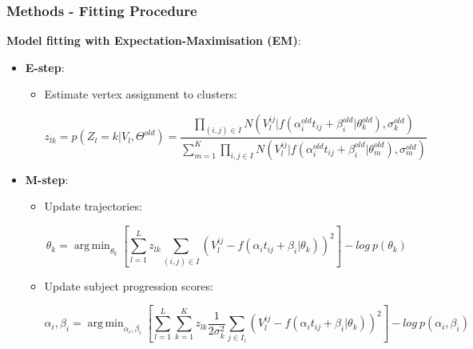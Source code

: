 \documentclass[8pt,xcolor=table]{beamer}
\DeclareMathOperator*{\argmin}{arg\,min}
\begin{document}
\begin{frame}
\frametitle{Methods - Fitting Procedure}


     
    \vspace{1em} 
    \textbf{Model fitting with Expectation-Maximisation (EM)}:
    \vspace{1em}
    \begin{itemize}
    \item \textbf{E-step}:
    \begin{itemize}
     \item Estimate vertex assignment to clusters:
     
     \begin{equation}
 z_{lk} =  p(Z_l = k|V_l,\Theta^{old}) =  \frac{\prod_{(i,j) \in I} N(V_l^{ij} | f(\alpha_i^{old} t_{ij} + \beta_i^{old} | \theta_k^{old}), \sigma_k^{old})}{\sum_{m=1}^K \prod_{i,j \in I} N(V_l^{ij} | f(\alpha_i^{old} t_{ij} + \beta_i^{old} | \theta_m^{old}), \sigma_m^{old})}
\end{equation}

    \end{itemize}
    \item \textbf{M-step}:
    \begin{itemize}
     \item Update trajectories:
     
     \begin{equation}
 \label{eq:theta}
 \theta_k = \argmin_{\theta_k} \left[\sum_{l=1}^L z_{lk} \sum_{(i,j) \in I} (V_l^{ij} - f(\alpha_i t_{ij} + \beta_i | \theta_k))^2 \right] - log\ p(\theta_k) 
\end{equation}
     
     \item Update subject progression scores:
     
     \begin{equation}
\label{eq:alpha}
 \alpha_i, \beta_i = \argmin_{\alpha_i, \beta_i}  \left[ \sum_{l=1}^L \sum_{k=1}^K z_{lk} \frac{1}{2\sigma_k^2} \sum_{j \in I_i} (V_l^{ij} - f(\alpha_i t_{ij} + \beta_i | \theta_k))^2\right] - log\ p(\alpha_i, \beta_i)
\end{equation}
     
    \end{itemize}
    \end{itemize}


\end{frame}
\end{document}
